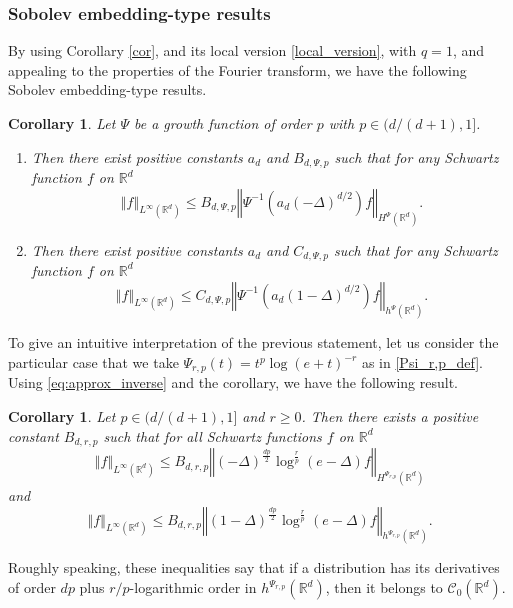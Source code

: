 \documentclass[a4paper, leqno, 10pt]{amsart}
\numberwithin{equation}{section}
\newtheorem{corollary}[thm]{Corollary}
\newcommand{\R}{\mathbb{R}}
\newcommand{\norm}[1]{\left\Vert#1\right\Vert}
\newcommand{\brkt}[1]{\left(#1\right)}
\begin{document}
\subsubsection{Sobolev embedding-type results}

By using Corollary \ref{cor}, and its local version \eqref{local_version}, with $q=1$, and appealing to the properties of the Fourier transform, we have the following Sobolev embedding-type results.

\begin{corollary} \label{Cor:18}
Let $\Psi$ be a growth function of order $p$ with  $p \in ( d/(d+1), 1 ]$.
\begin{enumerate}
\item Then there exist positive constants $a_d$ and $B_{d, \Psi, p}$ such that for any Schwartz function $f$ on $\R^d$ 
\[
\norm{f}_{L^\infty (\R^d)} \leq B_{d, \Psi, p} \norm{\Psi^{-1}\brkt{ a_d (-\Delta)^{d/2}} f}_{H^{\Psi} (\R^d)}.
\]
\item Then there exist positive constants $a_d$ and $C_{d, \Psi, p}$ such that for any Schwartz function $f$ on $\R^d$ 
\[
\norm{f}_{L^\infty (\R^d)} \leq C_{d, \Psi, p} \norm{\Psi^{-1}\brkt{ a_d {\brkt{1-\Delta}}^{d/2}} f}_{h^{\Psi} (\R^d)}.
\]
\end{enumerate}
\end{corollary} 
%

To give an intuitive interpretation of the previous statement, let us consider the particular case that we take $\Psi_{r,p}(t)=t^p\log(e+t)^{-r}$ as in \eqref{Psi_r,p_def}. Using \eqref{eq:approx_inverse} and the corollary,  we have the following result.

\begin{corollary}\label{cor_sobolev_embedding} Let $ p \in (d/(d+1), 1]$ and $r\geq 0$. Then there exists a positive constant $B_{d, r, p}$ such that for all Schwartz functions $f$ on $\R^d$
\[
\norm{f}_{L^\infty (\R^d)} \leq B_{d, r, p} \norm{(-\Delta)^{\frac{dp}{2}}\log^{\frac r p}(e-\Delta) f}_{H^{\Psi_{r,p}} (\R^d)}
\]
and 
\[
\norm{f}_{L^\infty (\R^d)} \leq B_{d, r, p} \norm{(1-\Delta)^{\frac{dp}{2}}\log^{\frac r p}(e-\Delta) f}_{h^{\Psi_{r,p}} (\R^d)}.
\]
\end{corollary}

Roughly speaking, these inequalities say that if a distribution has its derivatives of order $dp$ plus $r/p$-logarithmic order in $h^{\Psi_{r,p}}(\R^d)$, then it belongs to $\mathcal{C}_0(\R^d)$.
\end{document}
